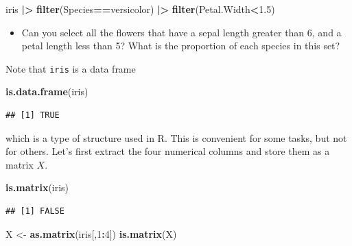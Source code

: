 \documentclass[
]{book}
\newenvironment{Shaded}{\begin{snugshade}}{\end{snugshade}}
\newcommand{\DecValTok}[1]{\textcolor[rgb]{0.00,0.00,0.81}{#1}}
\newcommand{\FloatTok}[1]{\textcolor[rgb]{0.00,0.00,0.81}{#1}}
\newcommand{\FunctionTok}[1]{\textcolor[rgb]{0.13,0.29,0.53}{\textbf{#1}}}
\newcommand{\NormalTok}[1]{#1}
\newcommand{\OtherTok}[1]{\textcolor[rgb]{0.56,0.35,0.01}{#1}}
\newcommand{\SpecialCharTok}[1]{\textcolor[rgb]{0.81,0.36,0.00}{\textbf{#1}}}
\newcommand{\StringTok}[1]{\textcolor[rgb]{0.31,0.60,0.02}{#1}}
\providecommand{\tightlist}{%
  \setlength{\itemsep}{0pt}\setlength{\parskip}{0pt}}
\theoremstyle{definition}
\theoremstyle{definition}
\theoremstyle{definition}
\theoremstyle{definition}
\theoremstyle{remark}
\begin{document}
\begin{Shaded}
\begin{Highlighting}[]
\NormalTok{iris }\SpecialCharTok{|\textgreater{}} \FunctionTok{filter}\NormalTok{(Species}\SpecialCharTok{==}\StringTok{\textquotesingle{}versicolor\textquotesingle{}}\NormalTok{) }\SpecialCharTok{|\textgreater{}} \FunctionTok{filter}\NormalTok{(Petal.Width}\SpecialCharTok{\textless{}}\FloatTok{1.5}\NormalTok{)}
\end{Highlighting}
\end{Shaded}

\begin{itemize}
\tightlist
\item
  Can you select all the flowers that have a sepal length greater than 6, and a petal length less than 5? What is the proportion of each species in this set?
\end{itemize}

Note that \texttt{iris} is a data frame

\begin{Shaded}
\begin{Highlighting}[]
\FunctionTok{is.data.frame}\NormalTok{(iris)}
\end{Highlighting}
\end{Shaded}

\begin{verbatim}
## [1] TRUE
\end{verbatim}

which is a type of structure used in R. This is convenient for some tasks, but not for others. Let's first extract the four numerical columns and store them as a matrix \(X\).

\begin{Shaded}
\begin{Highlighting}[]
\FunctionTok{is.matrix}\NormalTok{(iris)}
\end{Highlighting}
\end{Shaded}

\begin{verbatim}
## [1] FALSE
\end{verbatim}

\begin{Shaded}
\begin{Highlighting}[]
\NormalTok{X }\OtherTok{\textless{}{-}} \FunctionTok{as.matrix}\NormalTok{(iris[,}\DecValTok{1}\SpecialCharTok{:}\DecValTok{4}\NormalTok{])}
\FunctionTok{is.matrix}\NormalTok{(X)}
\end{Highlighting}
\end{Shaded}
\end{document}
